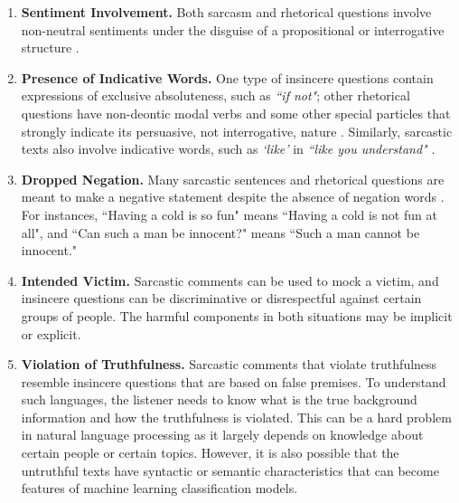\documentclass[12pt]{diazessay} %
\begin{document}
\begin{enumerate}
	\item \textbf{Sentiment Involvement.} Both sarcasm and rhetorical questions involve non-neutral sentiments under the disguise of a propositional or interrogative structure \citep{joshi2017, schmidt1977}. 
	\item \textbf{Presence of Indicative Words.} One type of insincere questions contain expressions of exclusive absoluteness, such as \textit{``if not"}; other rhetorical questions have non-deontic modal verbs and some other special particles that strongly indicate its persuasive, not interrogative, nature \citep{schmidt1977}. Similarly, sarcastic texts also involve indicative words, such as \textit{`like'} in \textit{``like you understand"} \citep{joshi2017}. 
	\item \textbf{Dropped Negation.} Many sarcastic sentences and rhetorical questions are meant to make a negative statement despite the absence of negation words  \citep{joshi2017, schmidt1977}. For instances, ``Having a cold is so fun" means ``Having a cold is not fun at all", and ``Can such a man be innocent?" means ``Such a man cannot be innocent."
	\item \textbf{Intended Victim.} Sarcastic comments can be used to mock a victim, and insincere questions can be discriminative or disrespectful against certain groups of people. The harmful components in both situations may be implicit or explicit. 
	\item \textbf{Violation of Truthfulness.} Sarcastic comments that violate truthfulness resemble insincere questions that are based on false premises. To understand such languages, the listener needs to know what is the true background information and how the truthfulness is violated\citep{joshi2017}. This can be a hard problem in natural language processing as it largely depends on knowledge about certain people or certain topics. However, it is also possible that the untruthful texts have syntactic or semantic characteristics that can become features of machine learning classification models.  
\end{enumerate}
\end{document}

